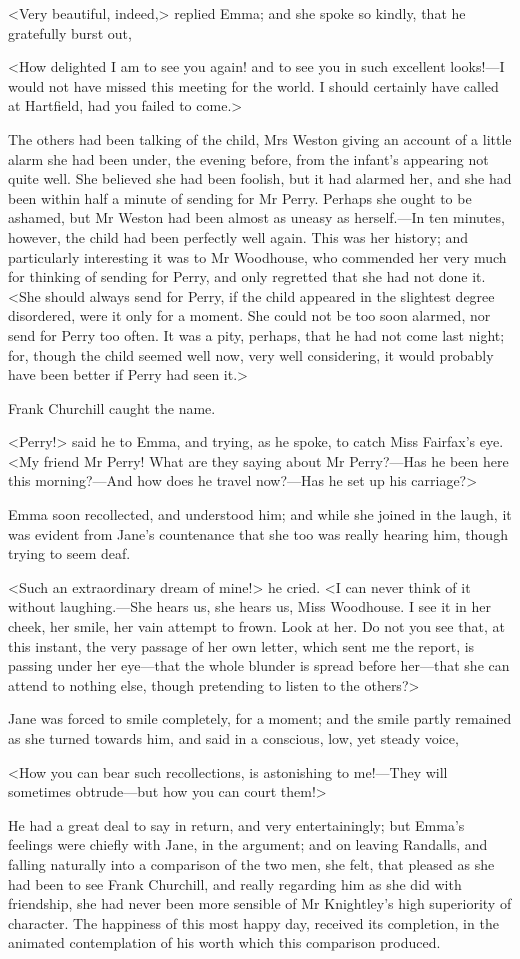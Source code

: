 <Very beautiful, indeed,> replied Emma; and she spoke so kindly, that he gratefully burst out,

<How delighted I am to see you again! and to see you in such excellent looks!—I would not have missed this meeting for the world. I should certainly have called at Hartfield, had you failed to come.>

The others had been talking of the child, Mrs Weston giving an account of a little alarm she had been under, the evening before, from the infant's appearing not quite well. She believed she had been foolish, but it had alarmed her, and she had been within half a minute of sending for Mr Perry. Perhaps she ought to be ashamed, but Mr Weston had been almost as uneasy as herself.—In ten minutes, however, the child had been perfectly well again. This was her history; and particularly interesting it was to Mr Woodhouse, who commended her very much for thinking of sending for Perry, and only regretted that she had not done it. <She should always send for Perry, if the child appeared in the slightest degree disordered, were it only for a moment. She could not be too soon alarmed, nor send for Perry too often. It was a pity, perhaps, that he had not come last night; for, though the child seemed well now, very well considering, it would probably have been better if Perry had seen it.>

Frank Churchill caught the name.

<Perry!> said he to Emma, and trying, as he spoke, to catch Miss Fairfax's eye. <My friend Mr Perry! What are they saying about Mr Perry?—Has he been here this morning?—And how does he travel now?—Has he set up his carriage?>

Emma soon recollected, and understood him; and while she joined in the laugh, it was evident from Jane's countenance that she too was really hearing him, though trying to seem deaf.

<Such an extraordinary dream of mine!> he cried. <I can never think of it without laughing.—She hears us, she hears us, Miss Woodhouse. I see it in her cheek, her smile, her vain attempt to frown. Look at her. Do not you see that, at this instant, the very passage of her own letter, which sent me the report, is passing under her eye—that the whole blunder is spread before her—that she can attend to nothing else, though pretending to listen to the others?>

Jane was forced to smile completely, for a moment; and the smile partly remained as she turned towards him, and said in a conscious, low, yet steady voice,

<How you can bear such recollections, is astonishing to me!—They will sometimes obtrude—but how you can court them!>

He had a great deal to say in return, and very entertainingly; but Emma's feelings were chiefly with Jane, in the argument; and on leaving Randalls, and falling naturally into a comparison of the two men, she felt, that pleased as she had been to see Frank Churchill, and really regarding him as she did with friendship, she had never been more sensible of Mr Knightley's high superiority of character. The happiness of this most happy day, received its completion, in the animated contemplation of his worth which this comparison produced.